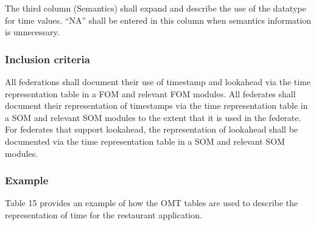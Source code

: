 \newpage
The third column (Semantics) shall expand and describe the use of the datatype for time values. ``NA'' shall be entered in this column when semantics information is unnecessary.

\subsubsection{Inclusion criteria}
All federations shall document their use of timestamp and lookahead via the time representation table in a FOM and relevant FOM modules. All federates shall document their representation of timestamps via the time representation table in a SOM and relevant SOM modules to the extent that it is used in the federate. For federates that support lookahead, the representation of lookahead shall be documented via the time representation table in a SOM and relevant SOM modules.

\vspace{-8pt}

\subsubsection{Example}
Table 15 provides an example of how the OMT tables are used to describe the representation of time for the restaurant application.

\vspace{-9.4pt}
\begingroup
\fontsize{9}{10.9}\selectfont
\setlength{\tabcolsep}{4pt}
\renewcommand{\arraystretch}{1.34}
\noindent{}
\endgroup\vspace{6.3pt}


